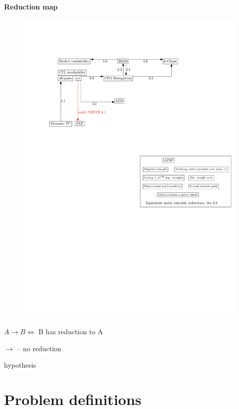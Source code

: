 \documentclass{amsart}
\newcommand{\mytitle}[2] {
	\begin{center}
		\bf {#1} {#2}
	\end{center}
}
\begin{document}
	\mytitle{}{Reduction map}
	
\begin{figure}[!htp]
	
	\begin{center}  
		\includegraphics[scale = 0.8]{map.pdf}
	\end{center}
		
\end{figure}
	
	$A \rightarrow B \Longleftrightarrow$ B has reduction to A
	
	{\color{red} $\longrightarrow$} -- no reduction
	
	{\color{blue} hypothesis}
	
	\section{Problem definitions}
	
\end{document}
